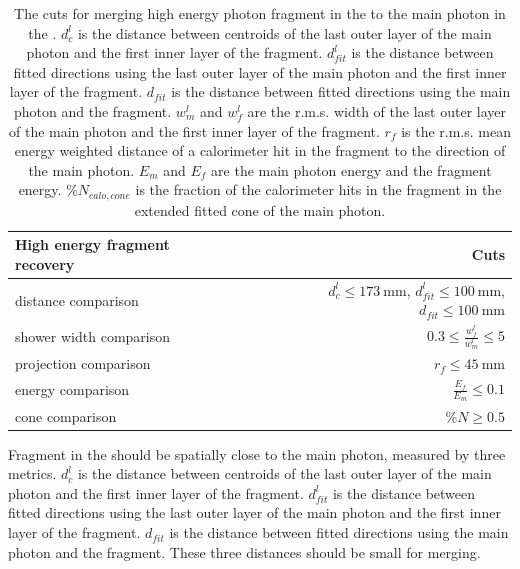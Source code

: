 \begin{table}[htbp]
\centering

\smallskip

\begin{tabular}{l r }
\hline
High energy fragment recovery&  Cuts\\
\hline
\multicolumn{1}{L{0.3\textwidth}}{distance comparison} & \multicolumn{1}{R{0.3\textwidth}}{$d^l_c \leqslant 173\ \text{mm}$, $d^l_{fit} \leqslant 100\ \text{mm}$, $d_{fit} \leqslant 100\ \text{mm}$} \\
\multicolumn{1}{L{0.3\textwidth}}{shower width comparison} & \multicolumn{1}{R{0.3\textwidth}}{$  0.3 \leqslant \frac{w^l_f}{w^l_m} \leqslant 5$} \\
\multicolumn{1}{L{0.3\textwidth}}{projection comparison} & \multicolumn{1}{R{0.3\textwidth}}{$ r_f \leqslant 45\ \text{mm}$} \\
\multicolumn{1}{L{0.3\textwidth}}{energy comparison} & \multicolumn{1}{R{0.3\textwidth}}{$ \frac{E_f}{E_m} \leqslant 0.1$} \\
\multicolumn{1}{L{0.3\textwidth}}{cone comparison} & \multicolumn{1}{R{0.3\textwidth}}{$ \%{N} \geqslant 0.5$} \\
\hline

\hline
\end{tabular}

\caption[Cuts for merging high energy photon fragment in the \HCAL.]%
{The cuts for merging high energy photon fragment in the \HCAL to the main photon in the \ECAL. $d^l_c$ is the distance between centroids of the last outer layer of the main photon and the first inner layer of the fragment. $d^l_{fit}$ is the distance between fitted directions using the last outer layer of the main photon and the first inner layer of the fragment. $d_{fit}$ is the distance between fitted directions using the main photon and the fragment. $w^l_m$ and $w^l_f$ are the r.m.s. width of the last outer layer of the main photon and the first inner layer of the fragment. $r_f$ is the r.m.s. mean energy weighted distance of a calorimeter hit in the fragment to the direction of the main photon. $E_m$ and $E_f$ are the main photon energy and the fragment energy. $\%{N_{calo,cone}}$ is the fraction of the calorimeter hits in the fragment in the extended fitted cone of the main photon.}
\label{tab:photonHighEnergyFragCuts}
\end{table}

Fragment in the \HCAL should be spatially close to the main photon, measured by three metrics. $d^l_c$ is the distance between centroids of the last outer layer of the main photon and the first inner layer of the fragment. $d^l_{fit}$ is the distance between fitted directions using the last outer layer of the main photon and the first inner layer of the fragment. $d_{fit}$ is the distance between fitted directions using the main photon and the fragment. These three distances should be small for merging.

